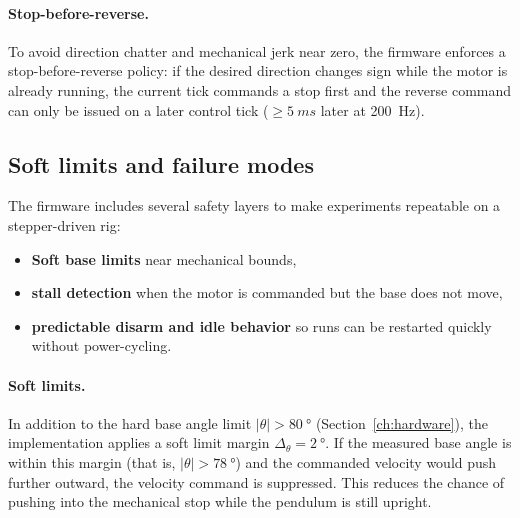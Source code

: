 \paragraph{Stop-before-reverse.}
To avoid direction chatter and mechanical jerk near zero, the firmware enforces a stop-before-reverse policy: if the desired direction changes sign while the motor is already running, the current tick commands a stop first and the reverse command can only be issued on a later control tick ($\ge\SI{5}{ms}$ later at \SI{200}{Hz}).

\subsection{Soft limits and failure modes}
The firmware includes several safety layers to make experiments repeatable on a stepper-driven rig:
\begin{itemize}
  \item \textbf{Soft base limits} near mechanical bounds,
  \item \textbf{stall detection} when the motor is commanded but the base does not move,
  \item \textbf{predictable disarm and idle behavior} so runs can be restarted quickly without power-cycling.
\end{itemize}

\paragraph{Soft limits.}
In addition to the hard base angle limit $|\theta|>\SI{80}{\degree}$ (Section~\ref{ch:hardware}), the implementation applies a soft limit margin $\Delta_\theta=\SI{2}{\degree}$. If the measured base angle is within this margin (that is, $|\theta|>\SI{78}{\degree}$) and the commanded velocity would push further outward, the velocity command is suppressed. This reduces the chance of pushing into the mechanical stop while the pendulum is still upright.


